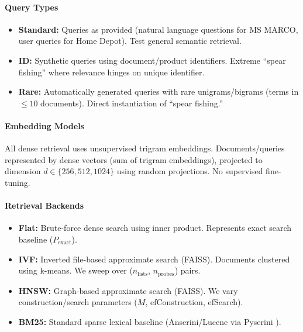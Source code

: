 \documentclass[conference,anonymous]{IEEEtran}
\begin{document}
\paragraph{Query Types}
\begin{itemize}
\item \textbf{Standard:} Queries as provided (natural language questions for MS MARCO, user queries for Home Depot). Test general semantic retrieval.

\item \textbf{ID:} Synthetic queries using document/product identifiers. Extreme ``spear fishing'' where relevance hinges on unique identifier.

\item \textbf{Rare:} Automatically generated queries with rare unigrams/bigrams (terms in $\leq 10$ documents). Direct instantiation of ``spear fishing.''
\end{itemize}

\paragraph{Embedding Models}
All dense retrieval uses unsupervised trigram embeddings. Documents/queries represented by dense vectors (sum of trigram embeddings), projected to dimension $d \in \{256, 512, 1024\}$ using random projections. No supervised fine-tuning.

\paragraph{Retrieval Backends}
\begin{itemize}
\item \textbf{Flat:} Brute-force dense search using inner product. Represents exact search baseline ($P_{\text{exact}}$).

\item \textbf{IVF:} Inverted file-based approximate search (FAISS). Documents clustered using k-means. We sweep over ($n_{\text{lists}}$, $n_{\text{probes}}$) pairs.

\item \textbf{HNSW:} Graph-based approximate search (FAISS). We vary construction/search parameters ($M$, efConstruction, efSearch).

\item \textbf{BM25:} Standard sparse lexical baseline (Anserini/Lucene via Pyserini \cite{lin2021pyserini}).
\end{itemize}
\end{document}
